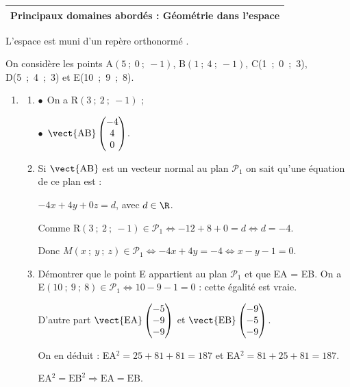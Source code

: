 \medskip

\begin{tabularx}{\linewidth}{|X|}\hline
\textbf{Principaux domaines abordés :} Géométrie dans l'espace\\ \hline
\end{tabularx}

\medskip

L'espace est muni d'un repère orthonormé \Oijk.

On considère les points A$(5~;~0~;~-1)$, B$(1~;~4~;~-1)$, C(1~;~0~;~3), D(5~;~4~;~3) et E(10~;~9~;~8).

\medskip

\begin{enumerate}
\item 
	\begin{enumerate}
		\item 
		

$\bullet~~$On a R$(3~;~2~;~-1)$ ;

$\bullet~~$$\vect{\text{AB}}\begin{pmatrix}-4\\4\\0\end{pmatrix}$.
		\item 
Si $\vect{\text{AB}}$ est un vecteur normal au plan $\mathcal{P}_1$ on sait qu'une équation de ce plan est :

$-4x + 4y + 0z = d$, avec $d \in \R$.

Comme R$(3~;~2~;~-1) \in \mathcal{P}_1 \iff -12 + 8 + 0 = d \iff d = - 4$.

Donc $M(x~;~y~;~z) \in \mathcal{P}_1 \iff - 4x + 4y = -4 \iff x - y - 1 = 0$.
		\item Démontrer que le point E appartient au plan $\mathcal{P}_1$ et que EA = EB.
On a E$(10~;~9~;~8) \in \mathcal{P}_1 \iff 10 - 9 - 1 = 0$ : cette égalité est vraie.

D'autre part $\vect{\text{EA}}\begin{pmatrix}-5\\-9\\-9\end{pmatrix}$ et 
$\vect{\text{EB}}\begin{pmatrix}-9\\-5\\-9\end{pmatrix}$.

On en déduit : EA$^2 = 25 + 81 + 81 = 187$ et EA$^2 = 81 + 25 + 81 = 187$.

EA$^2 = \text{EB}^2 \Rightarrow \text{EA} = \text{EB}$.


\end{enumerate}
\end{enumerate}
